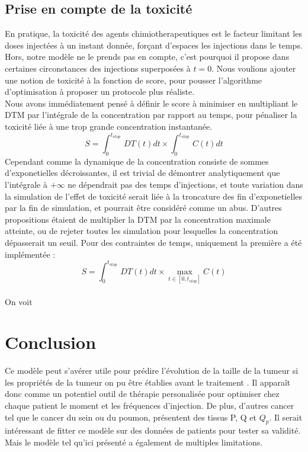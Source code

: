 \documentclass[12pt,a4paper]{article}
\begin{document}
\subsection[TODO Toxicité]{Prise en compte de la toxicité}
En pratique, la toxicité des agents chimiotherapeutiques est le facteur limitant les doses injectées à un instant donnée, forçant d'espaces les injections dans le temps. Hors, notre modèle ne le prends pas en compte, c'est pourquoi il propose dans certaines circonstances des injections superposées à $t=0$. Nous voulions ajouter une notion de toxicité à la fonction de score, pour pousser l'algorithme d'optimisation à proposer un protocole plus réaliste.\\ 
Nous avons immédiatement pensé à définir le score à minimiser en multipliant le \ac{DTM} par l'intégrale de la concentration par rapport au temps, pour pénaliser la toxicité liée à une trop grande concentration instantanée.\\
$$S=\int_{0}^{t_{stop}}\,DT(t)dt \times \int_{0}^{t_{stop}}\,C(t)dt$$
Cependant comme la dynamique de la concentration consiste de sommes d'exponetielles décroissantes, il est trivial de démontrer analytiquement que l'intégrale à $+\infty$ ne dépendrait pas des temps d'injections, et toute variation dans la simulation de l'effet de toxicité serait liée à la troncature des fin d'exponetielles par la fin de simulation, et pourrait être considéré comme un abus. D'autres propositions étaient de multiplier la \ac{DTM} par la concentration maximale atteinte, ou de rejeter toutes les simulation pour lesquelles la concentration dépasserait un seuil. Pour des contraintes de temps, uniquement la première a été implémentée :\\
$$S=\int_{0}^{t_{stop}}\,DT(t)dt \times \max_{t \in [0, t_{stop}]} C(t) $$\\
On voit 

\section{Conclusion}
Ce modèle peut s'avérer utile pour prédire l'évolution de la taille de la tumeur si les propriétés de la tumeur on pu être établies avant le traitement \cite{}. Il apparaît donc comme un potentiel outil de thérapie personalisée pour optimiser chez chaque patient le moment et les fréquences d'injection.  De plus, d'autres cancer tel que le cancer du sein ou du poumon, présentent des tissus P, Q et $Q_{p}$. Il serait intéressant de fitter ce modèle sur des données de patients pour tester sa validité. Mais le modèle tel qu'ici présenté a également de multiples limitations. 
\end{document}

